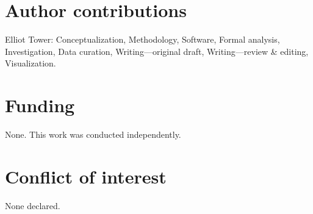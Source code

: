 \documentclass[11pt]{article}
\begin{document}
\section*{Author contributions}

Elliot Tower: Conceptualization, Methodology, Software, Formal analysis,
Investigation, Data curation, Writing---original draft, Writing---review \&
editing, Visualization.

\section*{Funding}

None. This work was conducted independently.

\section*{Conflict of interest}

None declared.




\end{document}
